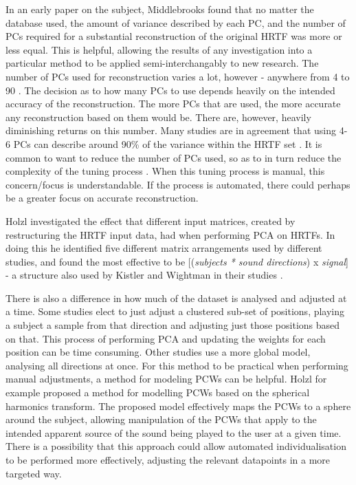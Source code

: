 In an early paper on the subject, Middlebrooks \citep{middlebrooks1992observations} found that no matter the database used, the amount of variance described by each PC, and the number of PCs required for a substantial reconstruction of the original HRTF was more or less equal. This is helpful, allowing the results of any investigation into a particular method to be applied semi-interchangably to new research. The number of PCs used for reconstruction varies a lot, however - anywhere from 4 \citep{martens1987principal} to 90 \citep{martens1987principal}. The decision as to how many PCs to use depends heavily on the intended accuracy of the reconstruction. The more PCs that are used, the more accurate any reconstruction based on them would be. There are, however, heavily diminishing returns on this number. Many studies are in agreement that using 4-6 PCs can describe around 90\% of the variance within the HRTF set \citep{martens1987principal} \citep{Kistler1992}. It is common to want to reduce the number of PCs used, so as to in turn reduce the complexity of the tuning process \citep{Hwang2007}. When this tuning process is manual, this concern/focus is understandable. If the process is automated, there could perhaps be a greater focus on accurate reconstruction.

Holzl \citep{Holzl2012} investigated the effect that different input matrices, created by restructuring the HRTF input data, had when performing PCA on HRTFs. In doing this he identified five different matrix arrangements used by different studies, and found the most effective to be [(\textit{subjects * sound directions}) x \textit{signal}] - a structure also used by Kistler and Wightman in their studies \citep{Kistler1992}. 

There is also a difference in how much of the dataset is analysed and adjusted at a time. Some studies \citep{Hwang2007} elect to just adjust a clustered sub-set of positions, playing a subject a sample from that direction and adjusting just those positions based on that. This process of performing PCA and updating the weights for each position can be time consuming. Other studies \citep{Holzl2014a} use a more global model, analysing all directions at once. For this method to be practical when performing manual adjustments, a method for modeling PCWs can be helpful. Holzl \citep{Holzl2014a} for example proposed a method for modelling PCWs based on the spherical harmonics transform. The proposed model effectively maps the PCWs to a sphere around the subject, allowing manipulation of the PCWs that apply to the intended apparent source of the sound being played to the user at a given time. There is a possibility that this approach could allow automated individualisation to be performed more effectively, adjusting the relevant datapoints in a more targeted way.

